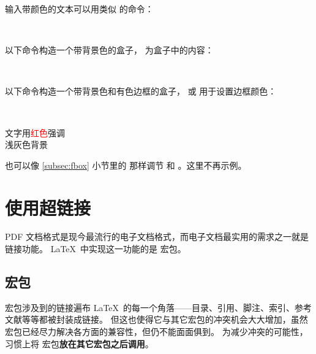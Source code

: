输入带颜色的文本可以用类似  的命令：
\begin{command}
 \\
\end{command}

以下命令构造一个带背景色的盒子， 为盒子中的内容：
\begin{command}
 \\
\end{command}

以下命令构造一个带背景色和有色边框的盒子， 或  用于设置边框颜色：
\begin{command}
 \\
\end{command}

\begin{example}
\sffamily
文字用\textcolor{red}{红色}强调\\
\colorbox[gray]{0.95}{浅灰色背景} \\
\end{example}

 也可以像 \ref{subsec:fbox} 小节里的  那样调节  和 。这里不再示例。

\section{使用超链接}\label{sec:hyperlinks}

PDF 文档格式是现今最流行的电子文档格式，而电子文档最实用的需求之一就是链接功能。
\LaTeX\ 中实现这一功能的是  宏包。

\subsection{ 宏包}\label{subsec:hyperref}

 宏包涉及到的链接遍布 \LaTeX\ 的每一个角落——目录、引用、脚注、索引、参考文献等等都被封装成链接。
但这也使得它与其它宏包的冲突机会大大增加，虽然宏包已经尽力解决各方面的兼容性，但仍不能面面俱到。
为减少冲突的可能性，习惯上将  宏包\textbf{放在其它宏包之后调用}。

